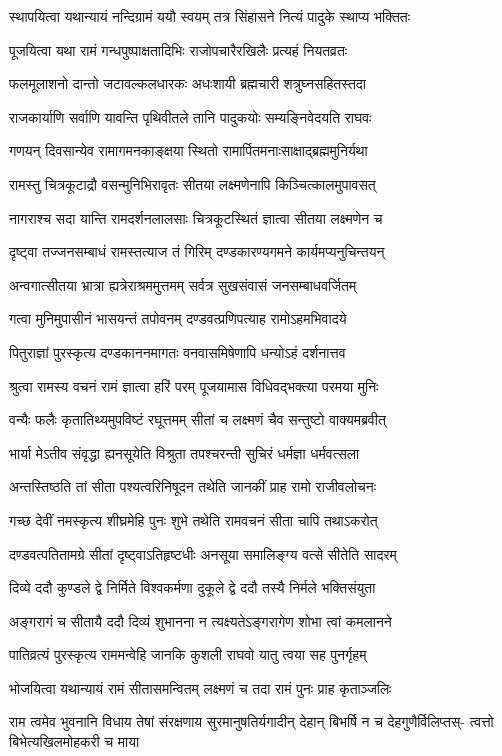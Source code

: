 \twolineshloka
{स्थापयित्वा यथान्यायं नन्दिग्रामं ययौ स्वयम्}
{तत्र सिंहासने नित्यं पादुके स्थाप्य भक्तितः} %

\twolineshloka
{पूजयित्वा यथा रामं गन्धपुष्पाक्षतादिभिः}
{राजोपचारैरखिलैः प्रत्यहं नियतव्रतः} %

\twolineshloka
{फलमूलाशनो दान्तो जटावल्कलधारकः}
{अधःशायी ब्रह्मचारी शत्रुघ्नसहितस्तदा} %

\twolineshloka
{राजकार्याणि सर्वाणि यावन्ति पृथिवीतले}
{तानि पादुकयोः सम्यङ्निवेदयति राघवः} %

\twolineshloka
{गणयन् दिवसान्येव रामागमनकाङ्क्षया}
{स्थितो रामार्पितमनाःसाक्षाद्ब्रह्ममुनिर्यथा} %

\twolineshloka
{रामस्तु चित्रकूटाद्रौ वसन्मुनिभिरावृतः}
{सीतया लक्ष्मणेनापि किञ्चित्कालमुपावसत्} %

\twolineshloka
{नागराश्च सदा यान्ति रामदर्शनलालसाः}
{चित्रकूटस्थितं ज्ञात्वा सीतया लक्ष्मणेन च} %

\twolineshloka
{दृष्ट्वा तज्जनसम्बाधं रामस्तत्याज तं गिरिम्}
{दण्डकारण्यगमने कार्यमप्यनुचिन्तयन्} %

\twolineshloka
{अन्वगात्सीतया भ्रात्रा ह्यत्रेराश्रममुत्तमम्}
{सर्वत्र सुखसंवासं जनसम्बाधवर्जितम्} %

\twolineshloka
{गत्वा मुनिमुपासीनं भासयन्तं तपोवनम्}
{दण्डवत्प्रणिपत्याह रामोऽहमभिवादये} %

\twolineshloka
{पितुराज्ञां पुरस्कृत्य दण्डकाननमागतः}
{वनवासमिषेणापि धन्योऽहं दर्शनात्तव} %

\twolineshloka
{श्रुत्वा रामस्य वचनं रामं ज्ञात्वा हरिं परम्}
{पूजयामास विधिवद्भक्त्या परमया मुनिः} %

\twolineshloka
{वन्यैः फलैः कृतातिथ्यमुपविष्टं रघूत्तमम्}
{सीतां च लक्ष्मणं चैव सन्तुष्टो वाक्यमब्रवीत्} %

\twolineshloka
{भार्या मेऽतीव संवृद्धा ह्यनसूयेति विश्रुता}
{तपश्चरन्ती सुचिरं धर्मज्ञा धर्मवत्सला} %

\twolineshloka
{अन्तस्तिष्ठति तां सीता पश्यत्वरिनिषूदन}
{तथेति जानकीं प्राह रामो राजीवलोचनः} %

\twolineshloka
{गच्छ देवीं नमस्कृत्य शीघ्रमेहि पुनः शुभे}
{तथेति रामवचनं सीता चापि तथाऽकरोत्} %

\twolineshloka
{दण्डवत्पतितामग्रे सीतां दृष्ट्वाऽतिहृष्टधीः}
{अनसूया समालिङ्ग्य वत्से सीतेति सादरम्} %

\twolineshloka
{दिव्ये ददौ कुण्डले द्वे निर्मिते विश्वकर्मणा}
{दुकूले द्वे ददौ तस्यै निर्मले भक्तिसंयुता} %

\twolineshloka
{अङ्गरागं च सीतायै ददौ दिव्यं शुभानना}
{न त्यक्ष्यतेऽङ्गरागेण शोभा त्वां कमलानने} %

\twolineshloka
{पातिव्रत्यं पुरस्कृत्य राममन्वेहि जानकि}
{कुशली राघवो यातु त्वया सह पुनर्गृहम्} %

\twolineshloka
{भोजयित्वा यथान्यायं रामं सीतासमन्वितम्}
{लक्ष्मणं च तदा रामं पुनः प्राह कृताञ्जलिः} %

\fourlineindentedshloka
{राम त्वमेव भुवनानि विधाय तेषां}
{संरक्षणाय सुरमानुषतिर्यगादीन्}
{देहान् बिभर्षि न च देहगुणैर्विलिप्तस्-}
{त्वत्तो बिभेत्यखिलमोहकरी च माया} %


